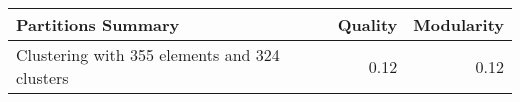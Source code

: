 \begin{tabular}{lrr}
\toprule
                           Partitions Summary &  Quality &  Modularity \\
\midrule
Clustering with 355 elements and 324 clusters &     0.12 &        0.12 \\
\bottomrule
\end{tabular}

